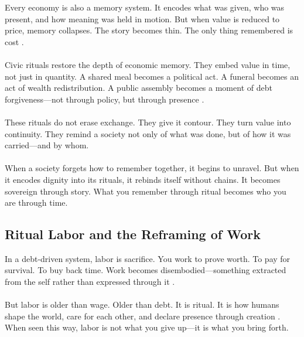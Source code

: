 \documentclass[12pt]{article}
\begin{document}
Every economy is also a memory system. It encodes what was given, who was present, and how meaning was held in motion. But when value is reduced to price, memory collapses. The story becomes thin. The only thing remembered is cost \citep{hyde2019gift,sahlins1972stone}.

\paragraph{}Civic rituals restore the depth of economic memory. They embed value in time, not just in quantity. A shared meal becomes a political act. A funeral becomes an act of wealth redistribution. A public assembly becomes a moment of debt forgiveness—not through policy, but through presence \citep{boyer2017civic,kimmerer2013braiding}.

\paragraph{}These rituals do not erase exchange. They give it contour. They turn value into continuity. They remind a society not only of what was done, but of how it was carried—and by whom.

\paragraph{}When a society forgets how to remember together, it begins to unravel. But when it encodes dignity into its rituals, it rebinds itself without chains. It becomes sovereign through story. What you remember through ritual becomes who you are through time.

\subsection{Ritual Labor and the Reframing of Work}

In a debt-driven system, labor is sacrifice. You work to prove worth. To pay for survival. To buy back time. Work becomes disembodied—something extracted from the self rather than expressed through it \citep{spade2015normal}.

\paragraph{}But labor is older than wage. Older than debt. It is ritual. It is how humans shape the world, care for each other, and declare presence through creation \citep{mauss1954gift}. When seen this way, labor is not what you give up—it is what you bring forth.
\end{document}
